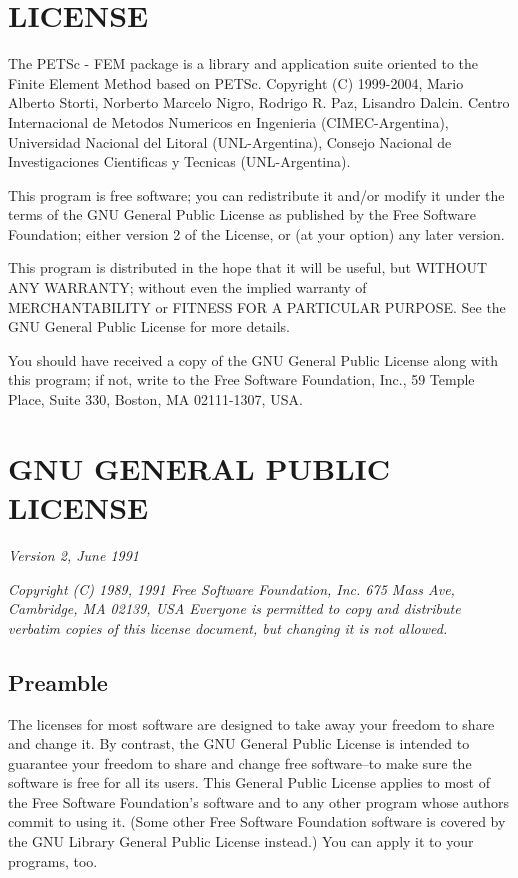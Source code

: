 \section{LICENSE}

The PETSc - FEM package is a library and application suite oriented to
the Finite Element Method based on PETSc.  Copyright (C) 1999-2004,
Mario Alberto Storti, Norberto Marcelo Nigro, Rodrigo R. Paz, Lisandro
Dalcin. Centro Internacional de Metodos Numericos en Ingenieria
(CIMEC-Argentina), Universidad Nacional del Litoral (UNL-Argentina),
Consejo Nacional de Investigaciones Cientificas y Tecnicas
(UNL-Argentina).
  
This program is free software; you can redistribute it and/or
modify it under the terms of the GNU General Public License
as published by the Free Software Foundation; either version 2
of the License, or (at your option) any later version.

This program is distributed in the hope that it will be useful,
but WITHOUT ANY WARRANTY; without even the implied warranty of
MERCHANTABILITY or FITNESS FOR A PARTICULAR PURPOSE.  See the
GNU General Public License for more details.

You should have received a copy of the GNU General Public License along
with this program; if not, write to the Free Software Foundation, Inc.,
59 Temple Place, Suite 330, Boston, MA 02111-1307, USA.

\section{GNU GENERAL PUBLIC LICENSE}

\emph{Version 2, June 1991}

\emph{Copyright (C) 1989, 1991 Free Software Foundation, Inc.
675 Mass Ave, Cambridge, MA 02139, USA Everyone is permitted to copy
and distribute verbatim copies of this license document, but changing
it is not allowed.}

\subsection{Preamble}

The licenses for most software are designed to take away your freedom
to share and change it.  By contrast, the GNU General Public License
is intended to guarantee your freedom to share and change free
software--to make sure the software is free for all its users.  This
General Public License applies to most of the Free Software
Foundation's software and to any other program whose authors commit to
using it.  (Some other Free Software Foundation software is covered by
the GNU Library General Public License instead.)  You can apply it to
your programs, too.

